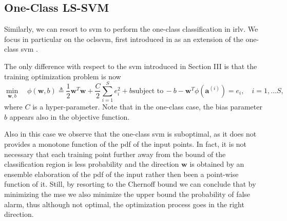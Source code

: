 \documentclass[draftcls,onecolumn,12pt]{IEEEtran}
\begin{document}
\subsection{One-Class LS-SVM}

Similarly, we can resort to \ac{svm} to perform the one-class classification in \ac{irlv}. We focus in particular on the  \ac{oclssvm}, first introduced in \cite{choi2009least} as an extension of the one-class \ac{svm} \cite{Scholkopf2001estimating}. 

The only difference with respect to the \ac{svm} introduced in Section III is that the training optimization problem is now
\begin{subequations}
	\label{eq:oneClassSvm}
	\begin{equation}
	\label{eq:oneClass1}
	\underset{\bm{w},b}{\min} \quad \phi(\bm{w}, b) \triangleq
	 \frac{1}{2} \bm{w}^T \bm{w} +  \frac{C}{2} \sum_{i=1}^S e_i^2 +b
	\end{equation}
	\begin{equation}
	\label{eq:oneClassConstr}
	\text{subject to}\, -b - \bm{w}^T \phi (\bm{a}^{(i)})  = e_i,  \quad i = 1,\dots S, 
	\end{equation}
\end{subequations}
where $C$ is a hyper-parameter.
Note that in the one-class case, the bias parameter $b$ appears also in the objective function.


Also in this case we observe that the one-class \ac{svm} is suboptimal, as it does not provides a monotone function of the \ac{pdf} of the input points. In fact, it is not necessary that each training point further away from the bound of the classification region is less probability and the direction $\bm{w}$ is obtained by an ensemble elaboration of the \ac{pdf} of the input rather then been a point-wise function of it. Still, by resorting to the Chernoff bound we can conclude that by minimizing the \ac{mse} we also minimize the upper bound the probability of false alarm, thus although not optimal, the optimization process goes in the right direction.
\end{document}
